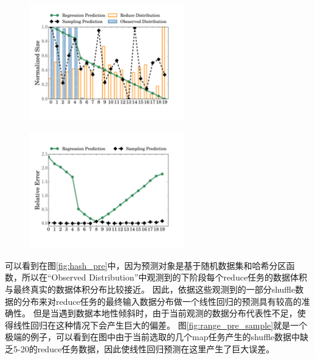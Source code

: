 \begin{figure}[!htp]
    \centering
	\includegraphics[width=0.6\textwidth]{../../PPoPP-2018/fig/range_pre_sample.pdf}
\end{figure}

\begin{figure}[!htp]
    \centering
	\includegraphics[width=0.6\textwidth]{../../PPoPP-2018/fig/prediction_relative_error.pdf}
\end{figure}

可以看到在图\ref{fig:hash_pre}中，因为预测对象是基于随机数据集和哈希分区函数，所以在“Observed Distribution”中观测到的下阶段每个reduce任务的数据体积与最终真实的数据体积分布比较接近。
因此，依据这些观测到的一部分shuffle数据的分布来对reduce任务的最终输入数据分布做一个线性回归的预测具有较高的准确性。
但是当遇到数据本地性倾斜时，由于当前观测的数据分布代表性不足，使得线性回归在这种情况下会产生巨大的偏差。
图\ref{fig:range_pre_sample}就是一个极端的例子，可以看到在图中由于当前选取的几个map任务产生的shuffle数据中缺乏5-20的reduce任务数据，因此使线性回归预测在这里产生了巨大误差。

